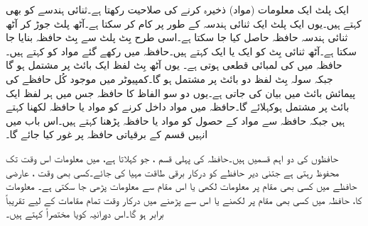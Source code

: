 ایک پلٹ ایک معلومات (مواد) ذخیرہ کرنے کی صلاحیت رکھتا ہے۔ثنائی ہندسے کو  بھی کہتے ہیں۔یوں ایک پلٹ ایک ثنائی ہندسہ  کے طور پر کام کر سکتا ہے۔آٹھ پلٹ جوڑ کر آٹھ ثنائی ہندسہ حافظہ حاصل کیا جا سکتا ہے۔اسی طرح  بِٹ پلٹ سے  بِٹ حافظہ بنایا جا سکتا ہے۔آٹھ ثنائی بِٹ کو ایک  یا ایک  کہتے ہیں۔حافظہ میں رکھے گئے مواد کو کہتے ہیں۔حافظہ میں  کی لمبائی قطعی ہوتی ہے۔ یوں آٹھ بِٹ لفظ ایک بائٹ پر مشتمل ہو گا جبکہ سولہ بِٹ لفظ دو بائٹ پر مشتمل ہو گا۔کمپیوٹر میں موجود کُل حافظے کی پیمائش بائٹ میں بیان کی جاتی ہے۔یوں دو سو الفاظ کا حافظہ جس میں ہر لفظ ایک بائٹ پر مشتمل ہوکہلائے گا۔حافظہ میں مواد داخل کرنے کو مواد یا حافظہ لکھنا کہتے ہیں جبکہ حافظہ سے مواد کے حصول کو مواد  یا حافظہ پڑھنا کہتے ہیں۔اس باب میں انہیں قسم کے برقیاتی حافظہ پر غور کیا جائے گا۔


حافظوں کی دو اہم قسمیں ہیں۔حافظہ کی پہلی قسم ، جو  کہلاتا ہے، میں معلومات اس وقت تک محفوظ رہتی ہے جتنی دیر حافظے کو درکار برقی طاقت مہیا کی جائے۔کسی بھی وقت ، عارضی حافظے میں کسی بھی مقام پر معلومات لکھی یا اس مقام سے معلومات پڑھی جا سکتی ہے۔ معلومات کا، حافظہ میں کسی بھی مقام پر لکھنے یا اس سے پڑھنے میں درکار وقت تمام مقامات کے لیے تقریباً برابر ہو گا۔اس دورانیہ کویا مختصراً  کہتے ہیں۔


